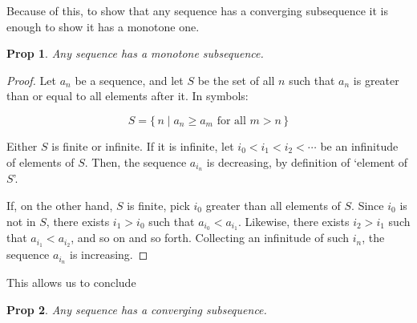 \documentclass{article}
\newtheorem{prop}{Prop}
\theoremstyle{definition}
\begin{document}
	Because of this, to show that any sequence has a converging subsequence it is enough to show it has a monotone one.
	
	\begin{prop}
	Any sequence has a monotone subsequence.
	\end{prop}
	
	\begin{proof}
	Let $a_n$ be a sequence, and let $S$ be the set of all $n$ such that $a_n$ is greater than or equal to all elements after it. In symbols:
	
	\[S = \{\,n \mid a_n \geq a_m \text{ for all $m > n$}\,\}\]
	
	Either $S$ is finite or infinite. If it is infinite, let $i_0 < i_1 < i_2 < \cdots$ be an infinitude of elements of $S$. Then, the sequence $a_{i_n}$ is decreasing, by definition of `element of $S$'.
	
	If, on the other hand, $S$ is finite, pick $i_0$ greater than all elements of $S$. Since $i_0$ is not in $S$, there exists $i_1 > i_0$ such that $a_{i_0} < a_{i_1}$. Likewise, there exists $i_2 > i_1$ such that $a_{i_1} < a_{i_2}$, and so on and so forth. Collecting an infinitude of such $i_n$, the sequence $a_{i_n}$ is increasing.
	\end{proof}
	
	This allows us to conclude
	
	\begin{prop}
	Any sequence has a converging subsequence.
	\end{prop}
\end{document}

